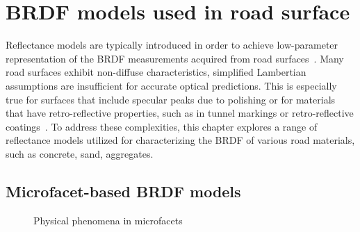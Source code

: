 \chapter{BRDF models used in road surface}
\label{ch: brdf-models}

Reflectance models are typically introduced in order to achieve low-parameter representation of the BRDF measurements acquired from road surfaces~\cite{2010_Roser}.
Many road surfaces exhibit non-diffuse characteristics, simplified Lambertian assumptions are insufficient for accurate optical predictions.
This is especially true for surfaces that include specular peaks due to polishing or for materials that have retro-reflective properties, such as in tunnel markings or retro-reflective coatings~\cite{2019_Iacomussi}.
To address these complexities, this chapter explores a range of reflectance models utilized for characterizing the BRDF of various road materials, such as concrete, sand, aggregates.

\section{Microfacet-based BRDF models}

\begin{figure}
    \centering
    \caption{Physical phenomena in microfacets}
\end{figure}

